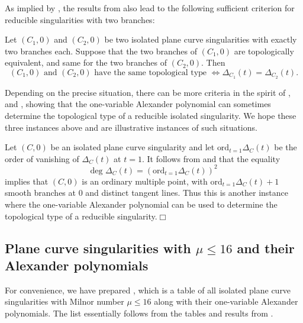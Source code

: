 As implied by \cite[Lemma 15]{Leviant2017}, the results from \cite{CDGZ2} also lead to the following sufficient criterion for reducible singularities with two branches:

\begin{corollary}\label{cor:onevariable_Alexander_recovers3} Let $(C_1,0)$ and $(C_2,0)$ be two isolated plane curve singularities with exactly two branches each. Suppose that the two branches of $(C_1,0)$ are topologically equivalent, and same for the two branches of $(C_2,0)$. Then
\begin{equation*}
(C_1,0)\mbox{ and } (C_2,0)\mbox{ have the same topological type }\Longleftrightarrow \Delta_{C_1}(t)=\Delta_{C_2}(t).
\end{equation*}
\end{corollary}

\noindent Depending on the precise situation, there can be more criteria in the spirit of ,  and , showing that the one-variable Alexander polynomial can sometimes determine the topological type of a reducible isolated singularity. We hope these three instances above and  are illustrative instances of such situations.

\begin{remark}\label{rmk:ordinary_fold}
Let $(C,0)$ be an isolated plane curve singularity and let $\mbox{ord}_{t=1}\Delta_C(t)$ be the order of vanishing of $\Delta_C(t)$ at $t=1$. It follows from \cite[Proposition 3.(i)]{Durfee1975} and \cite[Theorems 7.2 \& 10.5]{milnor1968} that the equality
$$\mbox{deg }\Delta_C(t)=(\mbox{ord}_{t=1}\Delta_C(t))^2$$
implies that $(C,0)$ is an ordinary multiple point, with $\mbox{ord}_{t=1}\Delta_C(t)+1$ smooth branches at $0$ and distinct tangent lines. Thus this is another instance where the one-variable Alexander polynomial can be used to determine the topological type of a reducible singularity.\hfill$\Box$
\end{remark}

\subsection{Plane curve singularities with $\mu\leq 16$ and their Alexander polynomials} For convenience, we have prepared , which is a table of all isolated plane curve singularities with Milnor number $\mu\leq16$ along with their one-variable Alexander polynomials. The list essentially follows from the tables and results from \cite{Arnold1976}.\\

